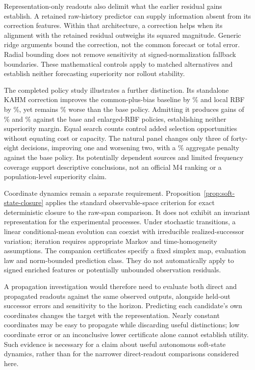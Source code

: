 Representation-only readouts also delimit what the earlier residual
gains establish. A retained raw-history predictor can supply information
absent from its correction features. Within that architecture, a
correction helps when its alignment with the retained residual
outweighs its squared magnitude. Generic ridge arguments bound the
correction, not the common forecast or total error. Radial bounding
does not remove sensitivity at signed-normalization fallback
boundaries. These mathematical controls apply to matched alternatives
and establish neither forecasting superiority nor rollout stability.

The completed policy study illustrates a further distinction.
Its standalone KAHM correction improves the common-plus-bias baseline
by \PAMechanismBiasGain\% and local RBF by
\PAMechanismRBFGain\%, yet remains
\PAStandalonePolicyPenalty\% worse than the base policy.
Admitting it produces gains of \PAGainPZero\% and
\PAGainExtra\% against the base and enlarged-RBF policies,
establishing neither superiority margin. Equal search counts control
added selection opportunities without equating cost or capacity.
The natural panel changes only three of forty-eight decisions,
improving one and worsening two, with a \PANaturalPenalty\%
aggregate penalty against the base policy. Its potentially dependent
sources and limited frequency coverage support descriptive conclusions,
not an official M4 ranking or a population-level superiority claim.

Coordinate dynamics remain a separate requirement.
Proposition~\ref{prop:soft-state-closure} applies the standard
observable-space criterion for exact deterministic closure to the
raw-span comparison. It does not exhibit an invariant representation
for the experimental processes. Under stochastic transitions, a
linear conditional-mean evolution can coexist with irreducible
realized-successor variation; iteration requires appropriate Markov
and time-homogeneity assumptions. The companion certificates
\citep{KumarKargaran2026Limits} specify a fixed simplex map,
evaluation law and norm-bounded prediction class. They do not
automatically apply to signed enriched features or potentially
unbounded observation residuals.

A propagation investigation would therefore need to evaluate both
direct and propagated readouts against the same observed outputs,
alongside held-out successor errors and sensitivity to the horizon.
Predicting each candidate's own coordinates changes the target with
the representation. Nearly constant coordinates may be easy to
propagate while discarding useful distinctions; low coordinate error
or an inconclusive lower certificate alone cannot establish utility.
Such evidence is necessary for a claim about useful autonomous
soft-state dynamics, rather than for the narrower direct-readout
comparisons considered here.


